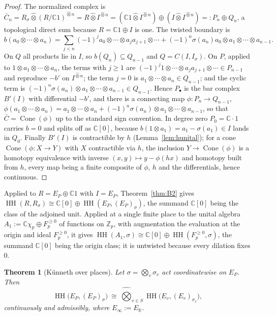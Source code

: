 \documentclass[11pt]{amsart}
\newtheorem{theorem}{Theorem}[section]
\theoremstyle{definition}
\theoremstyle{remark}
\newcommand{\C}{\mathbb C}
\newcommand{\R}{\mathbb R}
\newcommand{\Z}{\mathbb Z}
\newcommand{\Cone}{\operatorname{Cone}}
\newcommand{\HH}{\operatorname{HH}}
\begin{document}
\begin{proof}
The normalized complex is
$\bar C_n=R_{\sigma}\widehat\otimes(R/\C1)^{\widehat\otimes n}
=R\widehat\otimes I^{\widehat\otimes n}
=(\C1\widehat\otimes I^{\widehat\otimes n})\oplus
(I\widehat\otimes I^{\widehat\otimes n})=:P_n\oplus Q_n$, a topological direct
sum because $R=\C1\oplus I$ is one.  The twisted boundary is
\[
b(a_0\otimes\cdots\otimes a_n)=\sum_{j<n}(-1)^{j}a_0\otimes\cdots\otimes
a_ja_{j+1}\otimes\cdots+(-1)^{n}\sigma(a_n)a_0\otimes a_1\otimes\cdots\otimes
a_{n-1}.
\]
On $Q$ all products lie in $I$, so $b(Q_n)\subseteq Q_{n-1}$ and
$Q=C(I,I_{\sigma})$.  On $P$, applied to $1\otimes a_1\otimes\cdots\otimes
a_n$, the terms with $j\ge1$ are
$(-1)^{j}1\otimes\cdots\otimes a_ja_{j+1}\otimes\cdots\in P_{n-1}$ and
reproduce $-b'$ on $I^{\widehat\otimes n}$; the term $j=0$ is
$a_1\otimes\cdots\otimes a_n\in Q_{n-1}$; and the cyclic term is
$(-1)^{n}\sigma(a_n)\otimes a_1\otimes\cdots\otimes a_{n-1}\in Q_{n-1}$.  Hence
$P_{\bullet}$ is the bar complex $B'(I)$ with differential $-b'$, and there is
a connecting map $\phi:P_n\to Q_{n-1}$,
$\phi(a_1\otimes\cdots\otimes a_n)=a_1\otimes\cdots\otimes a_n+
(-1)^{n}\sigma(a_n)\otimes a_1\otimes\cdots\otimes a_{n-1}$, so that
$\bar C=\Cone(\phi)$ up to the standard sign convention.  In degree zero
$P_0=\C\cdot1$ carries $b=0$ and splits off as $\C[0]$, because
$b(1\otimes a_1)=a_1-\sigma(a_1)\in I$ lands in $Q_0$.  Finally $B'(I)$ is
contractible by $h$ (Lemma~\ref{lem:hunital}); for a cone $\Cone(\phi:X\to Y)$
with $X$ contractible via $h$, the inclusion $Y\to\Cone(\phi)$ is a homotopy
equivalence with inverse $(x,y)\mapsto y-\phi(hx)$ and homotopy built from $h$,
every map being a finite composite of $\phi$, $h$ and the differentials, hence
continuous.
\end{proof}

Applied to $R=E_P\oplus\C1$ with $I=E_P$, Theorem~\ref{thm:B2} gives
$\HH(R,R_{\sigma})\cong\C[0]\oplus\HH(E_P,(E_P)_{\sigma})$, the summand $\C[0]$
being the class of the adjoined unit.  Applied at a single finite place to the
unital algebra $A_1:=\C\chi_p\oplus F_p^{\ge0}$ of functions on $\Z_p$, with
augmentation the evaluation at the origin and ideal $F_p^{\ge0}$, it gives
$\HH(A_1,\sigma)\cong\C[0]\oplus\HH(F_p^{\ge0},\sigma)$, the summand $\C[0]$
being the origin class; it is untwisted because every dilation fixes $0$.

\begin{theorem}[K\"unneth over places]\label{thm:kunneth}
Let $\sigma=\bigotimes_v\sigma_v$ act coordinatewise on $E_P$.  Then
\begin{equation}\label{eq:kunneth}
\HH\bigl(E_P,(E_P)_{\sigma}\bigr)\ \cong\
\widehat\bigotimes_{v\in S}\HH\bigl(E_v,(E_v)_{\sigma_v}\bigr),
\end{equation}
continuously and admissibly, where $E_{\infty}:=E_{\R}$.
\end{theorem}
\end{document}
